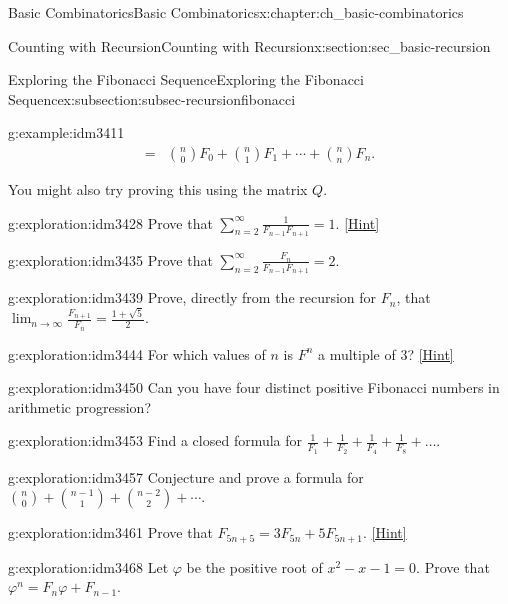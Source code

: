 \documentclass[oneside,10pt,]{book}
\numberwithin{equation}{chapter}
\newcommand{\amp}{&}
\begin{document}
\begin{chapterptx}{Basic Combinatorics}{}{Basic Combinatorics}{}{}{x:chapter:ch_basic-combinatorics}
\begin{sectionptx}{Counting with Recursion}{}{Counting with Recursion}{}{}{x:section:sec_basic-recursion}
\begin{subsectionptx}{Exploring the Fibonacci Sequence}{}{Exploring the Fibonacci Sequence}{}{}{x:subsection:subsec-recursionfibonacci}
\begin{example}{}{g:example:idm3411}
\begin{align*}
= \amp \binom{n}{0}F_0 + \binom{n}{1}F_1 + \cdots + \binom{n}{n}F_n \text{.}
\end{align*}
%
\par
You might also try proving this using the matrix \(Q\).%
\end{example}
\begin{exploration}{}{g:exploration:idm3428}%
Prove that \(\sum_{n = 2}^{\infty}\frac{1}{F_{n - 1}F_{n + 1}} = 1\).%
\space\hspace*{0pt}\hfill{\tiny\hyperlink{g:hint:idm3432-back}{[Hint]}}\end{exploration}
\begin{exploration}{}{g:exploration:idm3435}%
Prove that \(\sum_{n = 2}^{\infty}\frac{F_{n}}{F_{n - 1}F_{n + 1}} = 2.\)%
\end{exploration}
\begin{exploration}{}{g:exploration:idm3439}%
Prove, directly from the recursion for \(F_n\), that \(\lim_{n\to\infty}\frac{F_{n + 1}}{F_{n}} = \frac{1 + \sqrt{5}}{2}.\)%
\end{exploration}
\begin{exploration}{}{g:exploration:idm3444}%
For which values of \(n\) is \(F^{n}\) a multiple of 3?%
\space\hspace*{0pt}\hfill{\tiny\hyperlink{g:hint:idm3449-back}{[Hint]}}\end{exploration}
\begin{exploration}{}{g:exploration:idm3450}%
Can you have four distinct positive Fibonacci numbers in arithmetic progression?%
\end{exploration}
\begin{exploration}{}{g:exploration:idm3453}%
Find a closed formula for \(\frac{1}{F_{1}} + \frac{1}{F_{2}} + \frac{1}{F_{4}} + \frac{1}{F_{8}} + \ldots.\)%
\end{exploration}
\begin{exploration}{}{g:exploration:idm3457}%
Conjecture and prove a formula for \(\binom{n}{0} + \binom{n-1}{1} + \binom{n-2}{2} + \cdots\).%
\end{exploration}
\begin{exploration}{}{g:exploration:idm3461}%
Prove that \(F_{5n + 5} = 3F_{5n} + 5F_{5n + 1}\).%
\space\hspace*{0pt}\hfill{\tiny\hyperlink{g:hint:idm3465-back}{[Hint]}}\end{exploration}
\begin{exploration}{}{g:exploration:idm3468}%
Let \(\varphi\) be the positive root of \(x^{2} - x - 1 = 0\). Prove that \(\varphi^{n} = F_{n}\varphi + F_{n - 1}\).%

\end{exploration}
\end{subsectionptx}
\end{sectionptx}
\end{chapterptx}
\end{document}
